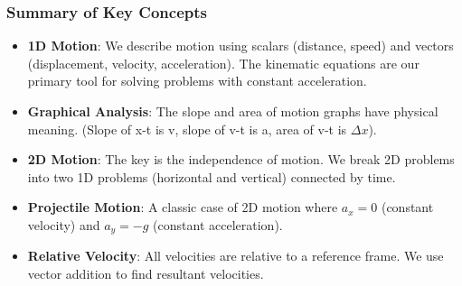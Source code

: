 \documentclass{beamer}
\begin{document}
\begin{frame}
\frametitle{Summary of Key Concepts}
\begin{itemize}
    \item \textbf{1D Motion}: We describe motion using scalars (distance, speed) and vectors (displacement, velocity, acceleration). The kinematic equations are our primary tool for solving problems with \alert{constant acceleration}.
    \vfill
    \item \textbf{Graphical Analysis}: The slope and area of motion graphs have physical meaning. (Slope of x-t is v, slope of v-t is a, area of v-t is $\Delta x$).
    \vfill
    \item \textbf{2D Motion}: The key is the \alert{independence of motion}. We break 2D problems into two 1D problems (horizontal and vertical) connected by time.
    \vfill
    \item \textbf{Projectile Motion}: A classic case of 2D motion where $a_x = 0$ (constant velocity) and $a_y = -g$ (constant acceleration).
    \vfill
    \item \textbf{Relative Velocity}: All velocities are relative to a reference frame. We use vector addition to find resultant velocities.
\end{itemize}
\end{frame}
\end{document}
